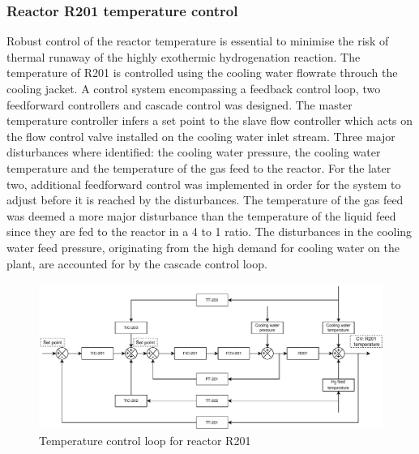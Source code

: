 \subsubsection{Reactor R201 temperature control} %
Robust control of the reactor temperature is essential to minimise the risk of thermal runaway of the highly exothermic hydrogenation reaction. The temperature of R201 is controlled using the cooling water flowrate throuch the cooling jacket. A control system encompassing a feedback control loop, two feedforward controllers and cascade control was designed. The master temperature controller infers a set point to the slave flow controller which acts on the flow control valve installed on the cooling water inlet stream. Three major disturbances where identified: the cooling water pressure, the cooling water temperature and the temperature of the gas feed to the reactor. For the later two, additional feedforward control was implemented in order for the system to adjust before it is reached by the disturbances. The temperature of the gas feed was deemed a more major disturbance than the temperature of the liquid feed since they are fed to the reactor in a 4 to 1 ratio. The disturbances in the cooling water feed pressure, originating from the high demand for cooling water on the plant, are accounted for by the cascade control loop.

\begin{figure}[H]
    \centering
    \includegraphics[width=0.8\linewidth]{chapters/4-operation-control/4-Figures/R201-TC.pdf}
    \caption{Temperature control loop for reactor R201}
    \label{fig:R201-TC}
\end{figure}

